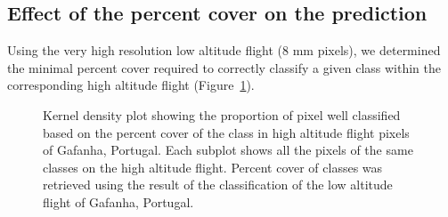 \documentclass[
  number]{elsarticle}
\begin{document}
\subsection{Effect of the percent cover on the
prediction}\label{effect-of-the-percent-cover-on-the-prediction}

Using the very high resolution low altitude flight (8 mm pixels), we
determined the minimal percent cover required to correctly classify a
given class within the corresponding high altitude flight
(Figure~\ref{fig-upscaling}).

\label{cell-fig-upscaling}
\begin{figure}[H]


\caption{\label{fig-upscaling}Kernel density plot showing the proportion
of pixel well classified based on the percent cover of the class in high
altitude flight pixels of Gafanha, Portugal. Each subplot shows all the
pixels of the same classes on the high altitude flight. Percent cover of
classes was retrieved using the result of the classification of the low
altitude flight of Gafanha, Portugal.}

\end{figure}%
\end{document}

